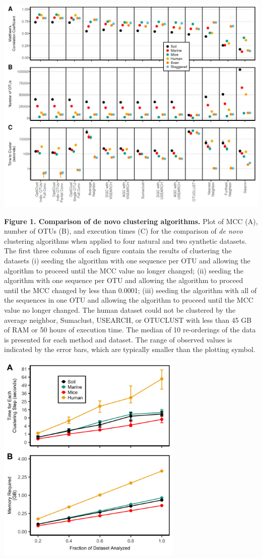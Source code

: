 \documentclass[11pt,]{article}
\begin{document}
\newpage

\includegraphics[width=6.0in]{../results/figures/performance.png}

\textbf{Figure 1. Comparison of de novo clustering algorithms.} Plot of
MCC (A), number of OTUs (B), and execution times (C) for the comparison
of \emph{de novo} clustering algorithms when applied to four natural and
two synthetic datasets. The first three columns of each figure contain
the results of clustering the datasets (i) seeding the algorithm with
one sequence per OTU and allowing the algorithm to proceed until the MCC
value no longer changed; (ii) seeding the algorithm with one sequence
per OTU and allowing the algorithm to proceed until the MCC changed by
less than 0.0001; (iii) seeding the algorithm with all of the sequences
in one OTU and allowing the algorithm to proceed until the MCC value no
longer changed. The human dataset could not be clustered by the average
neighbor, Sumaclust, USEARCH, or OTUCLUST with less than 45 GB of RAM or
50 hours of execution time. The median of 10 re-orderings of the data is
presented for each method and dataset. The range of observed values is
indicated by the error bars, which are typically smaller than the
plotting symbol.

\newpage

\includegraphics[width=3.5in]{../results/figures/speed_memory.png}
\end{document}
